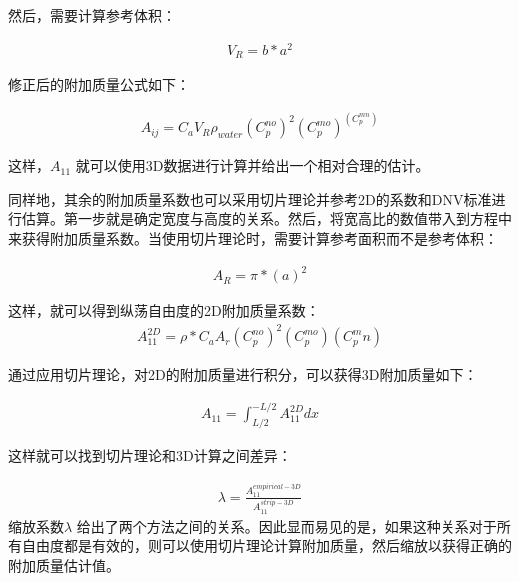 然后，需要计算参考体积：

\begin{equation}
\begin{aligned}
V_R = b \ast a^2
\end{aligned}
\end{equation}

修正后的附加质量公式如下：

\begin{equation}
\begin{aligned}
A_{ij} = C_a V_R \rho_{water}(C_p^{no})^2(C_p^{mo})^(C_p^{mn})
\end{aligned}
\end{equation}

这样，$A_{11}$ 就可以使用3D数据进行计算并给出一个相对合理的估计。

同样地，其余的附加质量系数也可以采用切片理论并参考2D的系数和DNV标准进行估算。第一步就是确定宽度与高度的关系。然后，将宽高比的数值带入到方程中来获得附加质量系数。当使用切片理论时，需要计算参考面积而不是参考体积：

\begin{equation}
\begin{aligned}
A_R = \pi \ast (a)^{2}
\end{aligned}
\end{equation}

这样，就可以得到纵荡自由度的2D附加质量系数：
\begin{equation}
\begin{aligned}
A_{11}^{2D} = \rho \ast C_a A_r(C_p^{no})^2(C_p^{mo})(C_p^mn)
\end{aligned}
\end{equation}

通过应用切片理论，对2D的附加质量进行积分，可以获得3D附加质量如下：

\begin{equation}
\begin{aligned}
A_{11} = \int_{L/2}^{-L/2}A_{11}^{2D}dx
\end{aligned}
\end{equation}

这样就可以找到切片理论和3D计算之间差异：

\begin{equation}
\begin{aligned}
\lambda = \frac{A_{11}^{empirical-3D}}{A_{11}^{strip-3D}}
\end{aligned}
\end{equation}
缩放系数$\lambda$ 给出了两个方法之间的关系。因此显而易见的是，如果这种关系对于所有自由度都是有效的，则可以使用切片理论计算附加质量，然后缩放以获得正确的附加质量估计值。

